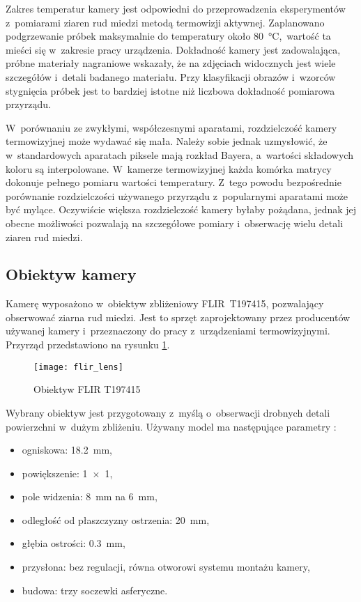 Zakres temperatur kamery jest odpowiedni do przeprowadzenia eksperymentów
z~pomiarami ziaren rud miedzi metodą termowizji aktywnej.
Zaplanowano podgrzewanie próbek maksymalnie do temperatury około
\SI{80}{\celsius},~wartość ta mieści się w~zakresie pracy urządzenia.
Dokładność kamery jest zadowalająca, próbne materiały nagraniowe wskazały, że na
zdjęciach widocznych jest wiele szczegółów i~detali badanego materiału.
Przy klasyfikacji obrazów i~wzorców stygnięcia próbek jest to bardziej istotne
niż liczbowa dokładność pomiarowa przyrządu.

W~porównaniu ze zwykłymi, współczesnymi aparatami, rozdzielczość kamery
termowizyjnej może wydawać się mała.
Należy sobie jednak uzmysłowić, że w~standardowych aparatach piksele mają
rozkład Bayera, a~wartości składowych koloru są interpolowane.
W~kamerze termowizyjnej każda komórka matrycy dokonuje pełnego pomiaru wartości
temperatury.
Z~tego powodu bezpośrednie porównanie rozdzielczości używanego przyrządu
z~popularnymi aparatami może być mylące.
Oczywiście większa rozdzielczość kamery byłaby pożądana, jednak jej obecne
możliwości pozwalają na szczegółowe pomiary i~obserwację wielu detali ziaren
rud miedzi.

\subsection{Obiektyw kamery}
\label{subsec:lens}
Kamerę wyposażono w~obiektyw zbliżeniowy FLIR~T197415, pozwalający obserwować
ziarna rud miedzi.
Jest to sprzęt zaprojektowany przez producentów używanej kamery i~przeznaczony
do pracy z~urządzeniami termowizyjnymi.
Przyrząd przedstawiono na rysunku \ref{fig:lens}.
\begin{figure}[htb]
    \centering
    \texttt{[image: flir\_lens]}
    \caption{Obiektyw FLIR T197415 \cite{flir_lens_specs}}
    \label{fig:lens}
\end{figure}
Wybrany obiektyw jest przygotowany z~myślą o~obserwacji drobnych detali
powierzchni w~dużym zbliżeniu.
Używany model ma następujące parametry \cite{flir_lens_specs}:
\begin{itemize}
    \item ogniskowa: \SI{18,2}{\milli\meter},
    \item powiększenie: \num{1x1},
    \item pole widzenia: \SI{8}{\milli\meter} na \SI{6}{\milli\meter},
    \item odległość od płaszczyzny ostrzenia: \SI{20}{\milli\meter},
    \item głębia ostrości: \SI{0,3}{\milli\meter},
    \item przysłona: bez regulacji, równa otworowi systemu montażu kamery,
    \item budowa: trzy soczewki asferyczne.
\end{itemize}

